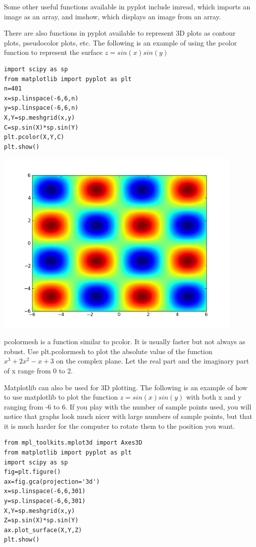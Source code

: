 Some other useful functions available in pyplot include imread, which imports an image as an array, and imshow, which displays an image from an array.

There are also functions in pyplot available to represent 3D plots as contour plots, pseudocolor plots, etc.
The following is an example of using the pcolor function to represent the surface $z=sin(x)sin(y)$
\begin{lstlisting}
import scipy as sp
from matplotlib import pyplot as plt
n=401
x=sp.linspace(-6,6,n)
y=sp.linspace(-6,6,n)
X,Y=sp.meshgrid(x,y)
C=sp.sin(X)*sp.sin(Y)
plt.pcolor(X,Y,C)
plt.show()
\end{lstlisting}

\includegraphics[width=120mm]{pcolor.png}

\begin{problem}
pcolormesh is a function similar to pcolor. It is usually faster but not always as robust.
Use plt.pcolormesh to plot the absolute value of the function $x^3 +2x^2 -x +3$ on the complex plane. Let the real part and the imaginary part of x range from 0 to 2.
\end{problem}

Matplotlib can also be used for 3D plotting. The following is an example of how to use matplotlib to plot the function $z=sin(x)sin(y)$ with both x and y ranging from -6 to 6. If you play with the number of sample points used, you will notice that graphs look much nicer with large numbers of sample points, but that it is much harder for the computer to rotate them to the position you want.

\begin{lstlisting}
from mpl_toolkits.mplot3d import Axes3D
from matplotlib import pyplot as plt
import scipy as sp
fig=plt.figure()
ax=fig.gca(projection='3d')
x=sp.linspace(-6,6,301)
y=sp.linspace(-6,6,301)
X,Y=sp.meshgrid(x,y)
Z=sp.sin(X)*sp.sin(Y)
ax.plot_surface(X,Y,Z)
plt.show()
\end{lstlisting}

